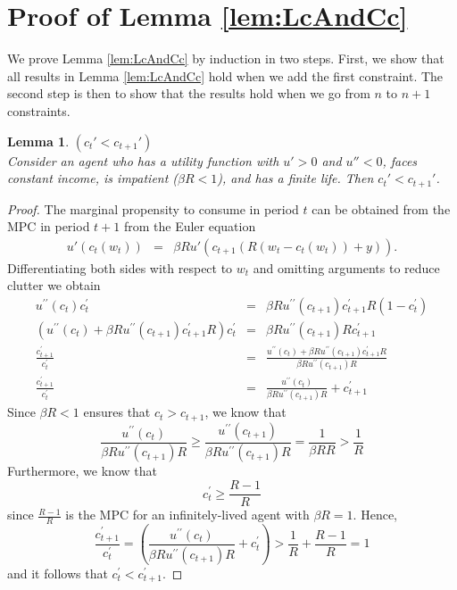 \documentclass[titlepage]{\econtex}
\newtheorem{lemma}{Lemma}
\begin{document}
  \section{Proof of Lemma \ref{lem:LcAndCc}}\label{app:pfclc}
  We prove Lemma \ref{lem:LcAndCc} by induction in two steps. First, we show that all results in Lemma \ref{lem:LcAndCc} hold when we add the first constraint. The second step is then to show that the results hold when we go from $n$ to $n+1$ constraints. 	
  
  \begin{lemma}\textit{$(c_{t}' < c_{t+1}')$} \\
    Consider an agent who has a utility function with $u' > 0$ and $u'' < 0$, faces constant income, is impatient ($\beta R < 1$), and has a finite life. Then $c_{t}' < c_{t+1}'$.
  \end{lemma}
  
  \begin{proof}
    The marginal propensity to consume in period $t$ can be obtained from the MPC in period $t+1$ from the Euler equation
    \begin{eqnarray*}
      u'(c_{t}(w_{t})) & =  & \beta R u'(c_{t+1}(R(w_{t}-c_{t}(w_{t}))+{y})).
    \end{eqnarray*}
    Differentiating both sides with respect to $w_{t}$ and omitting arguments to reduce
    clutter we obtain
    \begin{eqnarray*}
      u^{\prime\prime}(c_{t})c_{t}^{\prime} & =  & \beta R u^{\prime\prime}(c_{t+1})c_{t+1}^{\prime}R(1-c_{t}^{\prime}) \nonumber
      \\ \nonumber (u^{\prime\prime}(c_{t}) + \beta R u^{\prime\prime}(c_{t+1})c_{t+1}^{\prime}R)c_{t}^{\prime} & = & \beta R u^{\prime\prime}(c_{t+1})Rc_{t+1}^{\prime}
      \\ \frac{c_{t+1}^{\prime}}{c_{t}^{\prime}}   & = & \frac{u^{\prime\prime}(c_{t}) + \beta R u^{\prime\prime}(c_{t+1})c_{t+1}^{\prime}R}{\beta R u^{\prime\prime}(c_{t+1})R} \label{eq:mpcPF} \\
      \frac{c_{t+1}^{\prime}}{c_{t}^{\prime}}   & = & \frac{u^{\prime\prime}(c_{t})}{\beta R u^{\prime\prime}(c_{t+1})R} + c_{t+1}^{\prime} %
    \end{eqnarray*}
    Since $\beta R < 1$ ensures that $c_{t} > c_{t+1}$, we know that
    \[\frac{u^{\prime\prime}(c_{t})}{\beta R u^{\prime\prime}(c_{t+1})R} \geq  \frac{u^{\prime\prime}(c_{t+1})}{\beta R u^{\prime\prime}(c_{t+1})R} = \frac{1}{\beta R R} > \frac{1}{R}\]
    Furthermore, we know that
    \[c_{t}^{\prime} \geq \frac{R-1}{R}\]
    since $\frac{R-1}{R}$ is the MPC for an infinitely-lived agent with $\beta R = 1$. Hence, 
    \[\frac{c_{t+1}^{\prime}}{c_{t}^{\prime}} = \left(\frac{u^{\prime\prime}(c_{t})}{\beta R u^{\prime\prime}(c_{t+1})R} + c_{t}^{\prime} \right) > \frac{1}{R} + \frac{R-1}{R} = 1\]
    and it follows that $c_{t}^{\prime} <  c_{t+1}^{\prime}$.
  \end{proof}
  
\end{document}
